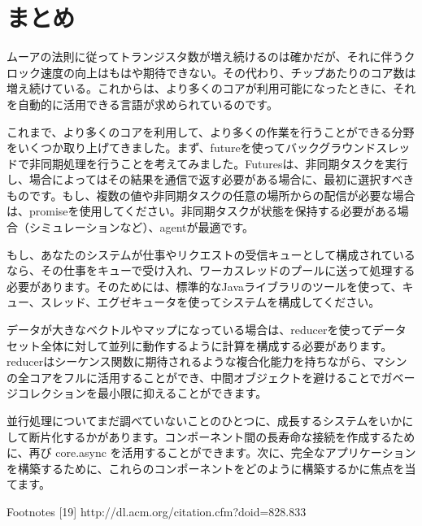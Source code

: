 \section{まとめ}

ムーアの法則に従ってトランジスタ数が増え続けるのは確かだが、それに伴うクロック速度の向上はもはや期待できない。その代わり、チップあたりのコア数は増え続けている。これからは、より多くのコアが利用可能になったときに、それを自動的に活用できる言語が求められているのです。

これまで、より多くのコアを利用して、より多くの作業を行うことができる分野をいくつか取り上げてきました。まず、futureを使ってバックグラウンドスレッドで非同期処理を行うことを考えてみました。Futuresは、非同期タスクを実行し、場合によってはその結果を通信で返す必要がある場合に、最初に選択すべきものです。もし、複数の値や非同期タスクの任意の場所からの配信が必要な場合は、promiseを使用してください。非同期タスクが状態を保持する必要がある場合（シミュレーションなど）、agentが最適です。

もし、あなたのシステムが仕事やリクエストの受信キューとして構成されているなら、その仕事をキューで受け入れ、ワーカスレッドのプールに送って処理する必要があります。そのためには、標準的なJavaライブラリのツールを使って、キュー、スレッド、エグゼキュータを使ってシステムを構成してください。

データが大きなベクトルやマップになっている場合は、reducerを使ってデータセット全体に対して並列に動作するように計算を構成する必要があります。reducerはシーケンス関数に期待されるような複合化能力を持ちながら、マシンの全コアをフルに活用することができ、中間オブジェクトを避けることでガベージコレクションを最小限に抑えることができます。

並行処理についてまだ調べていないことのひとつに、成長するシステムをいかにして断片化するかがあります。コンポーネント間の長寿命な接続を作成するために、再び core.async を活用することができます。次に、完全なアプリケーションを構築するために、これらのコンポーネントをどのように構築するかに焦点を当てます。


Footnotes
[19]
http://dl.acm.org/citation.cfm?doid=828.833